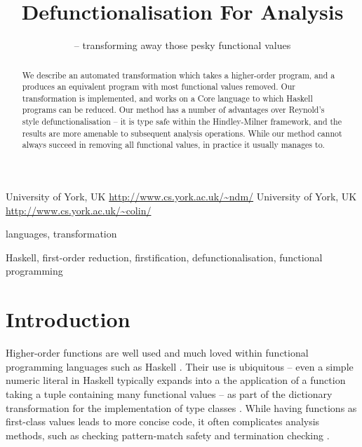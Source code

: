 \documentclass[preprint]{sigplanconf}
\begin{document}
\copyrightdata{[to be supplied]}

\titlebanner{\today{} - \currenttime{}}        %
\preprintfooter{}   %

\title{Defunctionalisation For Analysis}
\subtitle{ -- transforming away those pesky functional values}

           {University of York, UK}
           {\url{http://www.cs.york.ac.uk/~ndm/}}
           {University of York, UK}
           {\url{http://www.cs.york.ac.uk/~colin/}}

\maketitle

\begin{abstract}
We describe an automated transformation which takes a higher-order program, and a produces an equivalent program with most functional values removed. Our transformation is implemented, and works on a Core language to which Haskell programs can be reduced. Our method has a number of advantages over Reynold's style defunctionalisation -- it is type safe within the Hindley-Milner framework, and the results are more amenable to subsequent analysis operations. While our method cannot always succeed in removing all functional values, in practice it usually manages to.
\end{abstract}


\terms
languages, transformation

\keywords
Haskell, first-order reduction, firstification, defunctionalisation, functional programming

\section{Introduction}

Higher-order functions are well used and much loved within functional programming languages such as Haskell \cite{haskell}. Their use is ubiquitous -- even a simple numeric literal in Haskell typically expands into a the application of a function taking a tuple containing many functional values -- as part of the dictionary transformation for the implementation of type classes \cite{wadler:typeclasses}. While having functions as first-class values leads to more concise code, it often complicates analysis methods, such as checking pattern-match safety \cite{catch} and termination checking \cite{termination_checking}.
\end{document}

